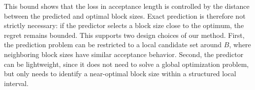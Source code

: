 \documentclass{article}
\begin{document}
This bound shows that the loss in acceptance length is controlled by the distance between the predicted and optimal block sizes. Exact prediction is therefore not strictly necessary: if the predictor selects a block size close to the optimum, the regret remains bounded. This supports two design choices of our method. First, the prediction problem can be restricted to a local candidate set around $B$, where neighboring block sizes have similar acceptance behavior. Second, the predictor can be lightweight, since it does not need to solve a global optimization problem, but only needs to identify a near-optimal block size within a structured local interval.









\end{document}
